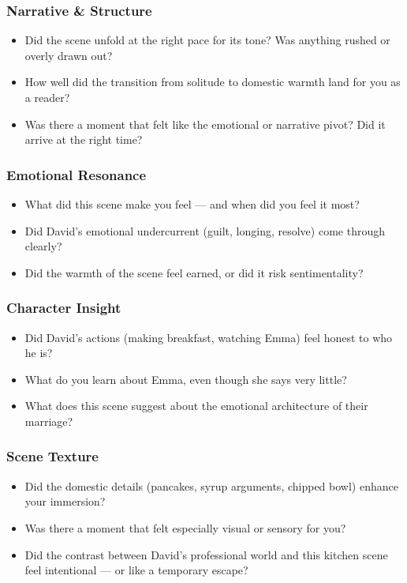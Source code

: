 \subsubsection*{Narrative \& Structure}

\begin{itemize}
  \item Did the scene unfold at the right pace for its tone? Was anything rushed or overly drawn out?
  \item How well did the transition from solitude to domestic warmth land for you as a reader?
  \item Was there a moment that felt like the emotional or narrative pivot? Did it arrive at the right time?
\end{itemize}

\subsubsection*{Emotional Resonance}

\begin{itemize}
  \item What did this scene make you feel — and when did you feel it most?
  \item Did David’s emotional undercurrent (guilt, longing, resolve) come through clearly?
  \item Did the warmth of the scene feel earned, or did it risk sentimentality?
\end{itemize}

\subsubsection*{Character Insight}

\begin{itemize}
  \item Did David’s actions (making breakfast, watching Emma) feel honest to who he is?
  \item What do you learn about Emma, even though she says very little?
  \item What does this scene suggest about the emotional architecture of their marriage?
\end{itemize}

\subsubsection*{Scene Texture}

\begin{itemize}
  \item Did the domestic details (pancakes, syrup arguments, chipped bowl) enhance your immersion?
  \item Was there a moment that felt especially visual or sensory for you?
  \item Did the contrast between David’s professional world and this kitchen scene feel intentional — or like a temporary escape?
\end{itemize}

